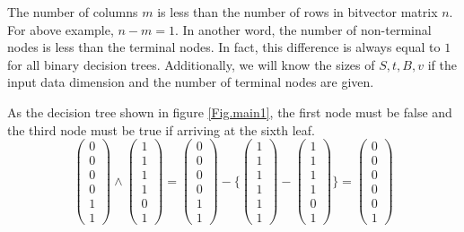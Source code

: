 \documentclass[UTF8]{article}
\begin{document}
The number of columns $m$ is less than the number of rows in bitvector matrix $n$.
For above example, $n-m=1$.
In another word, the number of non-terminal nodes is less than  the terminal nodes.
In fact, this difference is always equal to $1$ for all binary decision trees.
Additionally, we will know the sizes of $S, t, B, v$
if the input data dimension
and the number of terminal nodes are given.

As the decision tree shown in figure \ref{Fig.main1},
the first node must be false and the third node must be true if arriving at the sixth leaf.
\begin{equation}
\begin{pmatrix}0\\ 0\\ 0\\ 0\\ 1\\1 \nonumber \end{pmatrix}
\wedge
\begin{pmatrix} 1\\ 1\\ 1\\ 1\\ 0\\1 \nonumber\end{pmatrix}=
\begin{pmatrix} 0\\ 0\\ 0\\ 0\\ 1\\1 \nonumber\end{pmatrix}
-\{\begin{pmatrix}1\\ 1\\ 1\\ 1\\ 1\\1 \nonumber \end{pmatrix}
-\begin{pmatrix} 1\\ 1\\ 1\\ 1\\ 0\\1 \nonumber\end{pmatrix}\}
=\begin{pmatrix}0\\ 0\\ 0\\ 0\\ 0\\1 \nonumber\end{pmatrix}
\end{equation}
\end{document}

